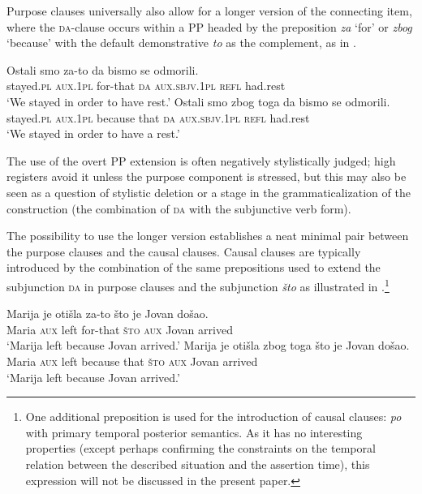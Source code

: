 \documentclass[output=paper]{langscibook}
\begin{document}
\noindent Purpose clauses universally also allow for a longer version of the connecting item, where the \textsc{da}-clause occurs within a PP headed by the preposition \textit{za} `for' or \textit{zbog} `because' with the default demonstrative \textit{to} as the complement, as in .

\ea\label{ex:Zato-da}
    \ea \gll Ostali smo za-to da bismo se odmorili.\\
    stayed.\textsc{pl} \textsc{aux.1pl} for-that \textsc{da} \textsc{aux.sbjv.1pl} \textsc{refl} had.rest\\
    \glt `We stayed in order to have rest.'
    \ex \gll Ostali smo zbog toga da bismo se odmorili.\\
    stayed.\textsc{pl} \textsc{aux.1pl} because that \textsc{da} \textsc{aux.sbjv.1pl} \textsc{refl} had.rest\\
    \glt `We stayed in order to have a rest.'
\z\z

\noindent The use of the overt PP extension is often negatively stylistically judged; high registers avoid it unless the purpose component is stressed, but this may also be seen as a question of stylistic deletion or a stage in the grammaticalization of the construction (the combination of \textsc{da} with the subjunctive verb form).

The possibility to use the longer version establishes a neat minimal pair between the purpose clauses and the causal clauses. Causal clauses are typically introduced by the combination of the same prepositions used to extend the subjunction \textsc{da} in purpose clauses and the subjunction \textit{što} as illustrated in .\footnote{One additional preposition is used for the introduction of causal clauses: \textit{po} with primary temporal posterior semantics. As it has no interesting properties (except perhaps confirming the constraints on the temporal relation between the described situation and the assertion time), this expression will not be discussed in the present paper.}

\ea\label{Caus-claus1}
	\ea \gll Marija je otišla za-to što je Jovan došao.\\
    Maria \textsc{aux} left for-that \textsc{što} \textsc{aux} Jovan arrived\\
    \glt `Marija left because Jovan arrived.'\label{ex:Caus-claus-a}
	\ex \gll Marija je otišla zbog toga što je Jovan došao.\\
    Maria \textsc{aux} left because that \textsc{što} \textsc{aux} Jovan arrived\\
    \glt `Marija left because Jovan arrived.'\label{ex:Caus-claus-b}
\z\z
\end{document}

